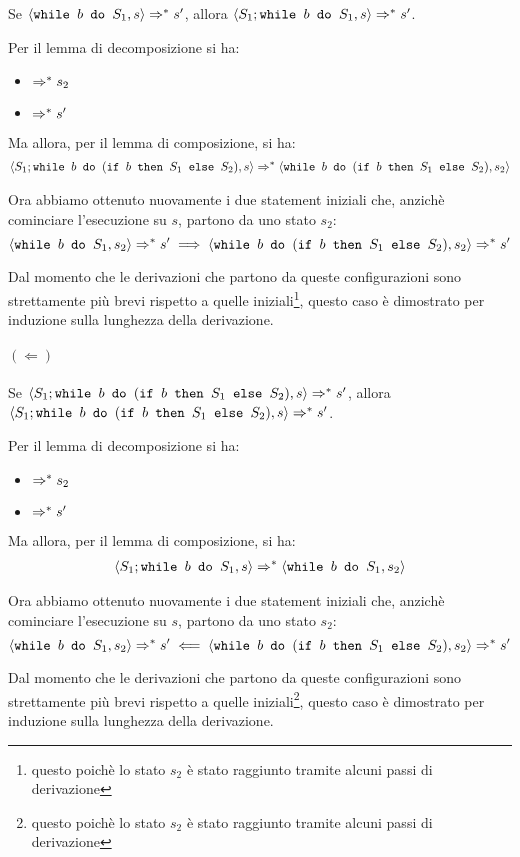 Se $\confSs{\wbS{b}{S_1}}{s} \Rar{*} s'$, allora
$\confSs{S_1;\wbS{b}{S_1}}{s} \Rar{*} s'$.

Per il lemma di decomposizione si ha:
\begin{itemize}
  \item {} $\Rar{*} s_2$
  \item {} $\Rar{*} s'$
\end{itemize}

Ma allora, per il lemma di composizione, si ha:
\begin{align*}
\confSs{S_1; \wbS{b}{(\ifABC{b}{S_1}{S_2})}}{s}
\Rar{*}
\confSs{\wbS{b}{(\ifABC{b}{S_1}{S_2})}}{s_2}
\end{align*}

Ora abbiamo ottenuto nuovamente i due statement iniziali che, anzichè
cominciare l'esecuzione su $s$, partono da uno stato $s_2$:
$$
\confSs{\wbS{b}{S_1}}{s_2} \Rar{*} s'
  \implies
\confSs{\wbS{b}{(\ifABC{b}{S_1}{S_2})}}{s_2} \Rar{*} s'
$$

Dal momento che le derivazioni che partono da queste configurazioni sono
strettamente più brevi rispetto a quelle iniziali\footnote{questo poichè lo
stato $s_2$ è stato raggiunto tramite alcuni passi di derivazione}, questo
caso è dimostrato per induzione sulla lunghezza della derivazione.

\paragraph{$(\Leftarrow)$}

Se $\confSs{S_1; \wbS{b}{(\ifABC{b}{S_1}{S_2})}}{s} \Rar{*} s'$, allora
$\confSs{S_1; \wbS{b}{(\ifABC{b}{S_1}{S_2})}}{s} \Rar{*} s'$.

Per il lemma di decomposizione si ha:
\begin{itemize}
  \item {} $\Rar{*} s_2$
  \item {} $\Rar{*} s'$
\end{itemize}

Ma allora, per il lemma di composizione, si ha:
\begin{align*}
\confSs{S_1; \wbS{b}{S_1}}{s}
\Rar{*}
\confSs{\wbS{b}{S_1}}{s_2}
\end{align*}

Ora abbiamo ottenuto nuovamente i due statement iniziali che, anzichè
cominciare l'esecuzione su $s$, partono da uno stato $s_2$:
$$
\confSs{\wbS{b}{S_1}}{s_2} \Rar{*} s'
  \impliedby
\confSs{\wbS{b}{(\ifABC{b}{S_1}{S_2})}}{s_2} \Rar{*} s'
$$

Dal momento che le derivazioni che partono da queste configurazioni sono
strettamente più brevi rispetto a quelle iniziali\footnote{questo poichè lo
stato $s_2$ è stato raggiunto tramite alcuni passi di derivazione}, questo
caso è dimostrato per induzione sulla lunghezza della derivazione.

\cvd


